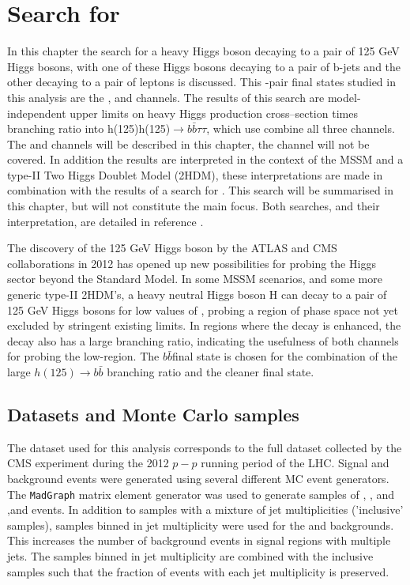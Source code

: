 \chapter{\texorpdfstring{Search for \Htohhtobbtautau}{Search for H -> hh -> bbtautau}}
\label{sec:hhh}

In this chapter the search for a heavy Higgs boson decaying to a pair of 125 GeV Higgs bosons, with one of these Higgs bosons decaying to 
a pair of b-jets and the other decaying to a pair of \Ptau leptons is discussed. This \Pgt-pair final states studied in this analysis
are the \etau, \mutau and \tautau channels. The results of this search are model-independent
upper limits on heavy Higgs production cross--section times branching ratio into h(125)h(125)$\rightarrow b\bar{b} \tau\tau$, which use
combine all three channels. The \etau and \mutau channels will be described in this chapter, the \tautau channel will not
be covered. In addition  the results are interpreted in the context of the MSSM and a type-II Two Higgs Doublet Model (2HDM), 
these interpretations are made in combination with the results of a search for \AtoZhtolltautau. 
This search will be summarised in this chapter, but will not constitute the main focus.
Both searches, and their interpretation, are detailed in reference \cite{CMS-HIG-14-034}.

The discovery of the 125 GeV Higgs boson by the ATLAS and CMS collaborations in 2012 \cite{HDiscoveryAtlas,HDiscoveryCMS} has opened up
new possibilities for probing the Higgs sector beyond the Standard Model. In some MSSM scenarios, and some more
generic type-II 2HDM's, a heavy neutral Higgs boson H can decay to a pair of 125 GeV Higgs bosons for low values
of \tanb, probing a region of phase space not yet excluded by stringent existing limits. In regions where
the decay \Htohh is enhanced, the \AtoZh decay also has a large branching ratio, indicating the usefulness
of both channels for probing the low-\tanb region. The $b\bar{b}$\tautau final state is chosen for the combination
of the large $h(125) \rightarrow b\bar{b}$ branching ratio and the cleaner \htotautau final state.

\section{Datasets and Monte Carlo samples}
\label{sec:hhh_datasets}
The dataset used for this analysis corresponds to the full dataset collected by the CMS experiment during the 2012 $p-p$ 
running period of the LHC. 
Signal and background events were generated using several different MC event generators. The \texttt{MadGraph}
\cite{madgraph} matrix element generator was used to generate samples of \Wjets, \Zellell, \ttbar and \ZZ ,\WZ and \WW
events. In addition to samples with a mixture of jet multiplicities ('inclusive' samples), samples binned in jet multiplicity
were used for the \Wjets and \Zellell backgrounds. This increases the number of background events
in signal regions with multiple jets. The samples binned in jet multiplicity are combined with the
inclusive samples such that the fraction of events with each jet multiplicity is preserved.


